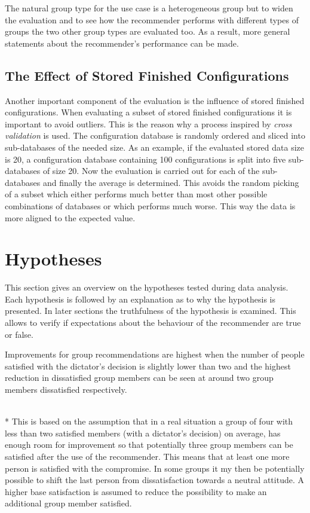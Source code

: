 The natural group type for the use case is a heterogeneous group but to widen the evaluation and to see how the recommender performs with different types of groups the two other group types are evaluated too. As a result, more general statements about the recommender's performance can be made.

\subsection{The Effect of Stored Finished Configurations}

Another important component of the evaluation is the influence of stored finished configurations. When evaluating a subset of stored finished configurations it is important to avoid outliers. This is the reason why a process inspired by \emph{cross validation} \cite{kohaviStudyCrossValidationBootstrap1995} is used. The configuration database is randomly ordered and sliced into sub-databases of the needed size. As an example, if the evaluated stored data size is 20, a configuration database containing 100 configurations is split into five sub-databases of size 20. Now the evaluation is carried out for each of the sub-databases and finally the average is determined. This avoids the random picking of a subset which either performs much better than most other possible combinations of databases or which performs much worse. This way the data is more aligned to the expected value.

\section{Hypotheses}
\label{sec:Evaluation:Hypotheses}

This section gives an overview on the hypotheses tested during data analysis. Each hypothesis is followed by an explanation as to why the hypothesis is presented. In later sections the truthfulness of the hypothesis is examined. This allows to verify if expectations about the behaviour of the recommender are true or false.

\begin{hypothesis}
    \begin{itshape}
        \label{hyp:Evaluation:MaximumMinimum} Improvements for group recommendations are highest when the number of people satisfied with the dictator's decision is slightly lower than two and the highest reduction in dissatisfied group members can be seen at around two group members dissatisfied respectively.
    \end{itshape} \medskip \\*    
    This is based on the assumption that in a real situation a group of four with less than two satisfied members (with a dictator's decision) on average, has enough room for improvement so that potentially three group members can be satisfied after the use of the recommender. This means that at least one more person is satisfied with the compromise. In some groups it my then be potentially possible to shift the last person from dissatisfaction towards a neutral attitude. A higher base satisfaction is assumed to reduce the possibility to make an additional group member satisfied.
\end{hypothesis}


